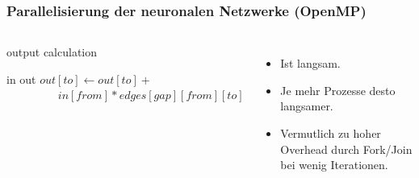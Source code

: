 \begin{frame}
    \frametitle{Parallelisierung der neuronalen Netzwerke (OpenMP)}
    \begin{columns}[t]
        \vspace{-0.5cm}
        \begin{algorithm}[H]
            \caption{output calculation}
            \begin{algorithmic}[1]
                \Require in
                \Ensure out
                    \State {}
                        \State $out[to] \gets out[to] +{}$
                        \State $\qquad\qquad\;\; in[from] * edges[gap][from][to]$
                        \EndFor
                    \EndParDo
                    \State {}
                \EndFor
            \end{algorithmic}
        \end{algorithm}
        \vspace{-0.5cm}
        \pause
        \begin{itemize}
            \item Ist langsam.
            \item Je mehr Prozesse desto langsamer.
            \item Vermutlich zu hoher Overhead durch Fork/Join bei wenig Iterationen.
        \end{itemize}
    \end{columns}
\end{frame}
